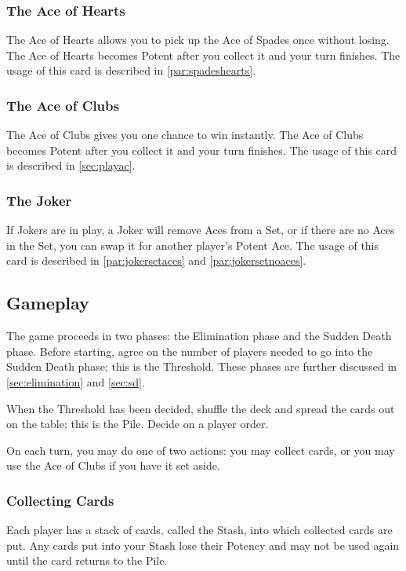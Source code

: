 \documentclass{article}
\begin{document}
\subsubsection{The Ace of Hearts}
The Ace of Hearts allows you to pick up the Ace of Spades once without
losing. The Ace of Hearts becomes Potent after you collect it and your
turn finishes. The usage of this card is described in
\ref{par:spadeshearts}.

\subsubsection{The Ace of Clubs}
The Ace of Clubs gives you one chance to win instantly. The Ace of Clubs
becomes Potent after you collect it and your turn finishes. The usage of
this card is described in \ref{sec:playac}.

\subsubsection{The Joker}
If Jokers are in play, a Joker will remove Aces from a Set, or if there
are no Aces in the Set, you can swap it for another player's Potent
Ace. The usage of this card is described in \ref{par:jokersetaces} and
\ref{par:jokersetnoaces}.

\subsection{Gameplay}
\label{sec:gameplay}

The game proceeds in two phases: the Elimination phase and the Sudden
Death phase. Before starting, agree on the number of players needed to
go into the Sudden Death phase; this is the Threshold. These phases are
further discussed in \ref{sec:elimination} and \ref{sec:sd}.

When the Threshold has been decided, shuffle the deck and spread the
cards out on the table; this is the Pile. Decide on a player order.

On each turn, you may do one of two actions: you may collect cards, or
you may use the Ace of Clubs if you have it set aside.

\subsubsection{Collecting Cards}
\label{sec:collecting}

Each player has a stack of cards, called the Stash, into which collected
cards are put. Any cards put into your Stash lose their Potency and may
not be used again until the card returns to the Pile.
\end{document}

